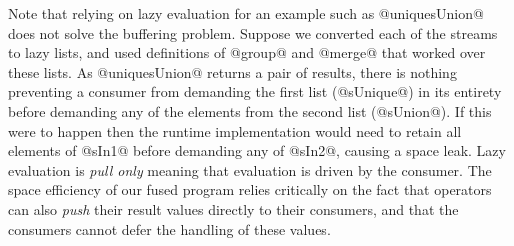 Note that relying on lazy evaluation for an example such as @uniquesUnion@ does not solve the buffering problem. Suppose we converted each of the streams to lazy lists, and used definitions of @group@ and @merge@ that worked over these lists. As @uniquesUnion@ returns a pair of results, there is nothing preventing a consumer from demanding the first list (@sUnique@) in its entirety before demanding any of the elements from the second list (@sUnion@). If this were to happen then the runtime implementation would need to retain all elements of @sIn1@ before demanding any of @sIn2@, causing a space leak. Lazy evaluation is \emph{pull only} meaning that evaluation is driven by the consumer. The space efficiency of our fused program relies critically on the fact that operators can also \emph{push} their result values directly to their consumers, and that the consumers cannot defer the handling of these values.




